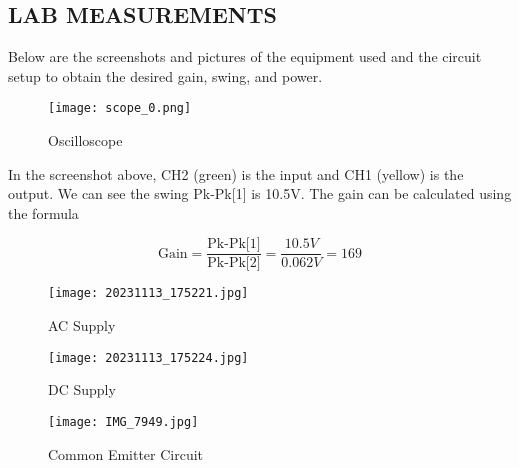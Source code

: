 \documentclass[conference]{IEEEtran}
\begin{document}
\subsection{LAB MEASUREMENTS}
Below are the screenshots and pictures of the equipment used and the circuit setup to obtain the desired gain, swing, and power.

\begin{figure}[h]
    \centering
    \texttt{[image: scope\_0.png]}
    \caption{Oscilloscope}
    \label{fig:oscilloscope}
\end{figure}

In the screenshot above, CH2 (green) is the input and CH1 (yellow) is the output. We can see the swing Pk-Pk[1] is 10.5V. The gain can be calculated using the formula 

\[ \text{Gain} = \frac{\text{Pk-Pk[1]}}{\text{Pk-Pk[2]}} = \frac{10.5V}{0.062V} = 169 \]

\begin{figure}[h]
    \centering
    \texttt{[image: 20231113\_175221.jpg]}
    \caption{AC Supply}
    \label{fig:ac-supply}
\end{figure}

\begin{figure}[h]
    \centering
    \texttt{[image: 20231113\_175224.jpg]}
    \caption{DC Supply}
    \label{fig:dc-supply}
\end{figure}

\begin{figure}[h]
    \centering
    \texttt{[image: IMG\_7949.jpg]}
    \caption{Common Emitter Circuit}
    \label{fig:common-emitter-circuit}
\end{figure}
\end{document}
